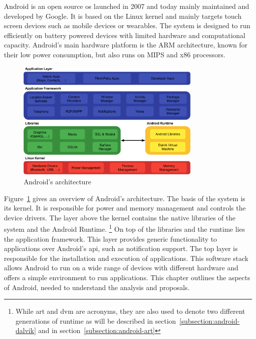 Android is an open source \gls{os} launched in 2007 and today mainly maintained and developed by Google.
It is based on the Linux kernel and mainly targets touch screen devices such as mobile devices or wearables.
The system is designed to run efficiently on battery powered devices with limited hardware and computational capacity.
Android's main hardware platform is the ARM architecture, known for their low power consumption, but also runs on MIPS and x86 processors.
\newline
\newline
\begin{figure}[h]
    \centering
    \includegraphics[width=0.8\textwidth]{data/stack.png}
    \caption{Android's architecture \cite{googleDalvik}}
    \label{fig:androidArchitecture}
\end{figure}
Figure~\ref{fig:androidArchitecture} gives an overview of Android's architecture.
\newline
The basis of the system is its kernel.
It is responsible for power and memory management and controls the device drivers.
\newline
The layer above the kernel contains the native libraries of the system and the Android Runtime.
\footnote[1]{While \gls{art} and \gls{dvm} are acronyms, they are also used to denote two different generations of runtime as will be described in section~\ref{subsection:android-dalvik} and in section~\ref{subsection:android-art}}
\newline
On top of the libraries and the runtime lies the application framework.
This layer provides generic functionality to applications over Android's \gls{api}, such as notification support.
\newline
The top layer is responsible for the installation and execution of applications.
\newline
This software stack allows Android to run on a wide range of devices with different hardware and offers a simple environment to run applications.
\newline
\newline
This chapter outlines the aspects of Android, needed to understand the analysis and proposals.
